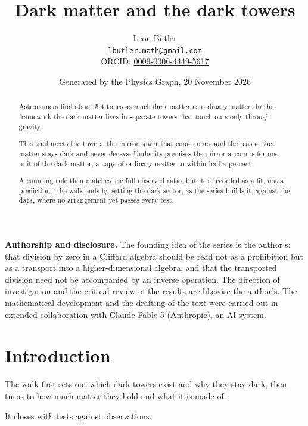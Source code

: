 \documentclass[11pt]{article}
\title{\bfseries Dark matter and the dark towers}
\author{Leon Butler\\ \normalsize\href{mailto:lbutler.math@gmail.com}{\texttt{lbutler.math@gmail.com}}\\ \normalsize ORCID: \href{https://orcid.org/0009-0006-4449-5617}{0009-0006-4449-5617}}
\date{Generated by the Physics Graph, 20 November 2026}
\theoremstyle{definition}
\theoremstyle{plain}
\begin{document}
\maketitle
\begin{abstract}
\normalsize
Astronomers find about 5.4 times as much dark matter as ordinary matter. In this framework the dark matter lives in separate towers that touch ours only through gravity.

This trail meets the towers, the mirror tower that copies ours, and the reason their matter stays dark and never decays. Under its premises the mirror accounts for one unit of the dark matter, a copy of ordinary matter to within half a percent.

A counting rule then matches the full observed ratio, but it is recorded as a fit, not a prediction. The walk ends by setting the dark sector, as the series builds it, against the data, where no arrangement yet passes every test.
\end{abstract}
\newpage
\noindent \textbf{Authorship and disclosure. }The founding idea of the series is the author's: that division by zero in a Clifford algebra should be read not as a prohibition but as a transport into a higher-dimensional algebra, and that the transported division need not be accompanied by an inverse operation. The direction of investigation and the critical review of the results are likewise the author's. The mathematical development and the drafting of the text were carried out in extended collaboration with Claude Fable 5 (Anthropic), an AI system.

\noindent{}
\newpage

\section*{Introduction}
The walk first sets out which dark towers exist and why they stay dark, then turns to how much matter they hold and what it is made of.

It closes with tests against observations.
\end{document}
